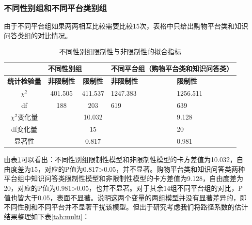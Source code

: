 \subsubsection{不同性别组和不同平台类别组}
由于不同平台组如果两两相互比较需要比较15次，表格中只给出购物平台类和知识问答类组的对比情况。
\begin{table}[H]
\centering
\caption{不同性别组限制性与非限制性的拟合指标}
\label{tab:constrain2}
\begin{tabular}{@{}cccll@{}}
\toprule
\multicolumn{1}{l}{} & \multicolumn{2}{l}{\textbf{不同性别组}} & \multicolumn{2}{l}{\textbf{不同平台组（购物平台类和知识问答类）}} \\ \midrule
\textbf{统计检验量}       & \textbf{非限制性}    & \textbf{限制性}    & \textbf{非限制性}    & \textbf{限制性}    \\ \midrule
$\chi^{2}$           & 401.505          & 411.537         & 1247.383         & 1256.511        \\
df                   & 188              & 203             & 619              & 639             \\
$\chi^{2}$变化量        &                  & 10.032          &                  & 9.128           \\
df变化量                &                  & 15              &                  & 20              \\
显著性                  &                  & 0.817           &                  & 0.981           \\ \bottomrule
\end{tabular}
\end{table}
由表\ref{tab:constrain2}可以看出：不同性别组限制性模型和非限制性模型的卡方差值为10.032，自由度差为15，对应的P值为0.817>0.05，并不显著。购物平台类和知识问答类两种平台组中知识问答类限制性模型和非限制性模型的卡方差值为9.128，自由度差为20，对应的P值为0.981>0.05，也并不显著。对于其余14组不同平台组的对比，P值也皆大于0.05，表面不显著。说明这两个变量的两组模型并没有显著差异的，即不同性别和不同平台并不显著干扰该模型。但出于研究考虑我们将路径系数的估计结果整理如下表\ref{tab:multi}：
 
